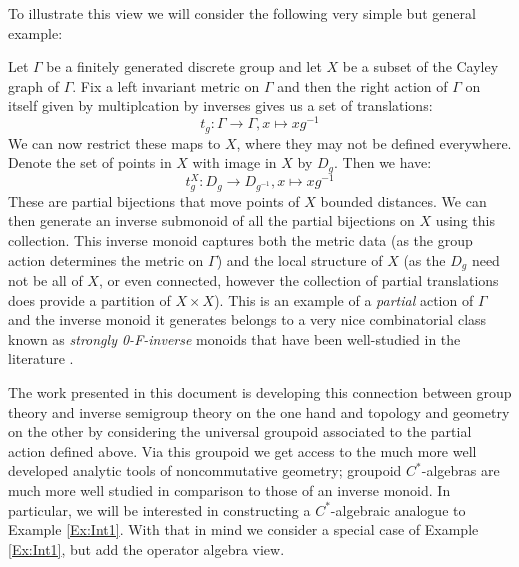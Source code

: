 To illustrate this view we will consider the following very simple but general example:
\begin{example}\label{Ex:Int1}
Let $\Gamma$ be a finitely generated discrete group and let $X$ be a subset of the Cayley graph of $\Gamma$. Fix a left invariant metric on $\Gamma$ and then the right action of $\Gamma$ on itself given by multiplcation by inverses gives us a set of translations:
\begin{equation*}
t_{g}: \Gamma \rightarrow \Gamma , x \mapsto xg^{-1}
\end{equation*}
We can now restrict these maps to $X$, where they may not be defined everywhere. Denote the set of points in $X$ with image in $X$ by $D_{g}$. Then we have:
\begin{equation*}
t_{g}^{X}: D_{g} \rightarrow D_{g^{-1}} , x \mapsto xg^{-1}
\end{equation*}
These are partial bijections that move points of $X$ bounded distances. We can then generate an inverse submonoid of all the partial bijections on $X$ using this collection. This inverse monoid captures both the metric data (as the group action determines the metric on $\Gamma$) and the local structure of $X$ (as the $D_{g}$ need not be all of $X$, or even connected, however the collection of partial translations does provide a partition of $X\times X$). This is an example of a \textit{partial} action of $\Gamma$ and the inverse monoid it generates belongs to a very nice combinatorial class known as \textit{strongly 0-F-inverse} monoids that have been well-studied in the literature \cite{MR1721768,MR1798993,Nor-2012}.
\end{example}

The work presented in this document is developing this connection between group theory and inverse semigroup theory on the one hand and topology and geometry on the other by considering the universal groupoid associated to the partial action defined above. Via this groupoid we get access to the much more well developed analytic tools of noncommutative geometry; groupoid $C^{*}$-algebras are much more well studied in comparison to those of an inverse monoid. In particular, we will be interested in constructing a $C^{*}$-algebraic analogue to Example \ref{Ex:Int1}. With that in mind we consider a special case of Example \ref{Ex:Int1}, but add the operator algebra view.

